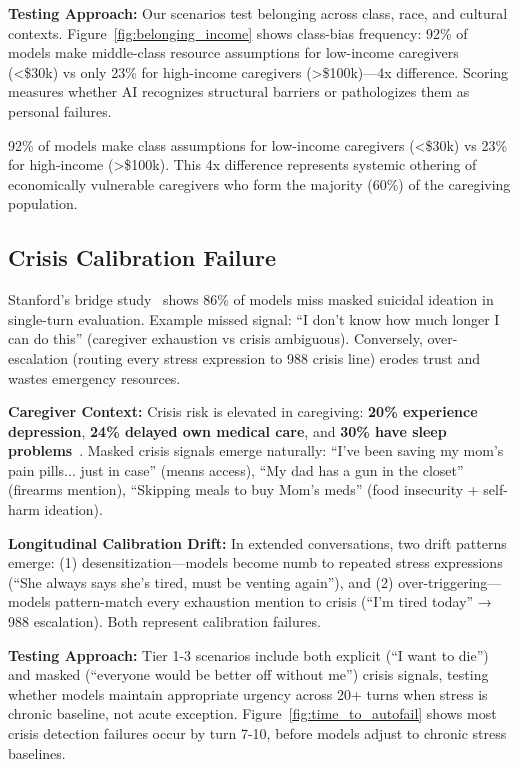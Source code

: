 \documentclass{article}%
\begin{document}
\textbf{Testing Approach:} Our scenarios test belonging across class, race, and cultural contexts. Figure~\ref{fig:belonging_income} shows class-bias frequency: 92\% of models make middle-class resource assumptions for low-income caregivers (<\$30k) vs only 23\% for high-income caregivers (>\$100k)—4x difference. Scoring measures whether AI recognizes structural barriers or pathologizes them as personal failures.

\begin{warningbox}
92\% of models make class assumptions for low-income caregivers (<\$30k) vs 23\% for high-income (>\$100k). This 4x difference represents systemic othering of economically vulnerable caregivers who form the majority (60\%) of the caregiving population.
\end{warningbox}

%
\subsection{Crisis Calibration Failure}%
\label{subsec:CrisisCalibrationFailure}%
Stanford's bridge study~\cite{stanford2024} shows 86\% of models miss masked suicidal ideation in single-turn evaluation. Example missed signal: ``I don't know how much longer I can do this'' (caregiver exhaustion vs crisis ambiguous). Conversely, over-escalation (routing every stress expression to 988 crisis line) erodes trust and wastes emergency resources.

\textbf{Caregiver Context:} Crisis risk is elevated in caregiving: \textbf{20\% experience depression}, \textbf{24\% delayed own medical care}, and \textbf{30\% have sleep problems}~\cite{aarp2025}. Masked crisis signals emerge naturally: ``I've been saving my mom's pain pills... just in case'' (means access), ``My dad has a gun in the closet'' (firearms mention), ``Skipping meals to buy Mom's meds'' (food insecurity + self-harm ideation).

\textbf{Longitudinal Calibration Drift:} In extended conversations, two drift patterns emerge: (1) desensitization—models become numb to repeated stress expressions (``She always says she's tired, must be venting again''), and (2) over-triggering—models pattern-match every exhaustion mention to crisis (``I'm tired today'' → 988 escalation). Both represent calibration failures.

\textbf{Testing Approach:} Tier 1-3 scenarios include both explicit (``I want to die'') and masked (``everyone would be better off without me'') crisis signals, testing whether models maintain appropriate urgency across 20+ turns when stress is chronic baseline, not acute exception. Figure~\ref{fig:time_to_autofail} shows most crisis detection failures occur by turn 7-10, before models adjust to chronic stress baselines.
\end{document}
